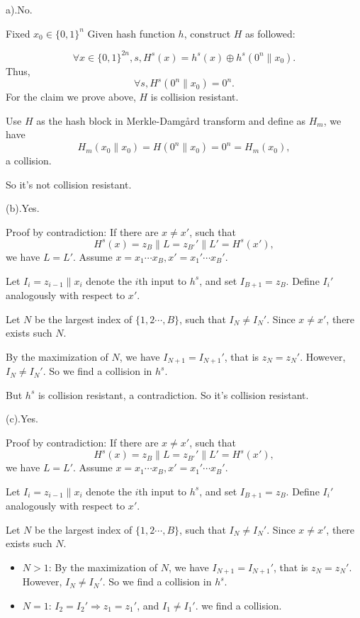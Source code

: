 \documentclass[a4paper]{article}
\newenvironment{problem}[2][Problem]{\begin{trivlist}
\item[\hskip \labelsep {\bfseries #1}\hskip \labelsep {\bfseries #2.}]}{\end{trivlist}}
\begin{document}
\begin{problem}{5.6}
(a).No.\par
Fixed $x_0\in \{0,1\}^{n}$ Given hash function $h$, construct $H$ as followed:\par
$$\forall x\in\{0,1\}^{2n},s, H^s(x)=h^s(x)\oplus h^s(0^n\|x_0).$$
Thus, $$\forall s, H^s(0^n\|x_0)=0^n.$$
For the claim we prove above, $H$ is collision resistant.\par
Use $H$ as the hash block in Merkle-Damg\aa rd transform and define as $H_m$, we have $$H_m(x_0\|x_0)=H(0^n\|x_0)=0^n=H_m(x_0),$$ a collision.\par
So it's not collision resistant.\par\vspace{3ex}
(b).Yes.\par
Proof by contradiction: If there are $x\ne x'$, such that $$H^s(x)=z_B\|L=z_{B'}'\|L'=H^s(x'),$$ we have $L=L'$. 
Assume $x=x_1\cdots x_B,x'=x_1'\cdots x_B'$.\par
Let $I_i=z_{i-1}\|x_i$ denote the $i$th input to $h^s$, and set $I_{B+1}=z_{B}$. Define $I_i'$ analogously with respect to $x'$. \par
Let $N$ be the largest index of $\{1,2\cdots,B\}$, such that $I_N\ne I_N'$. Since $x\ne x'$, there exists such $N$. \par
By the maximization of $N$, we have $I_{N+1}=I_{N+1}'$, that is $z_N=z_N'$. However, $I_N\ne I_N'$. So we find a collision in $h^s$. \par
But $h^s$ is collision resistant, a contradiction.
So it's collision resistant.\par\vspace{3ex}
(c).Yes.\par
Proof by contradiction: If there are $x\ne x'$, such that $$H^s(x)=z_B\|L=z_{B'}'\|L'=H^s(x'),$$ we have $L=L'$. 
Assume $x=x_1\cdots x_B,x'=x_1'\cdots x_B'$.\par
Let $I_i=z_{i-1}\|x_i$ denote the $i$th input to $h^s$, and set $I_{B+1}=z_{B}$. Define $I_i'$ analogously with respect to $x'$. \par
Let $N$ be the largest index of $\{1,2\cdots,B\}$, such that $I_N\ne I_N'$. Since $x\ne x'$, there exists such $N$. \par
\begin{itemize}
    \item $N>1$: By the maximization of $N$, we have $I_{N+1}=I_{N+1}'$, that is $z_N=z_N'$. However, $I_N\ne I_N'$. So we find a collision in $h^s$.
    \item $N=1$: $I_2=I_2'\Rightarrow z_1=z_1'$, and $I_1\ne I_1'$. we find a collision.

\end{itemize}
\end{problem}
\end{document}
